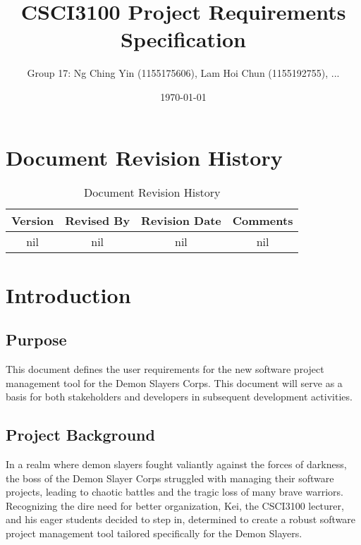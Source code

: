 \documentclass[11pt]{article}
\title{CSCI3100 Project Requirements Specification}
\author{Group 17: Ng Ching Yin (1155175606), Lam Hoi Chun (1155192755), ...}
\date{\today}
\begin{document}
\maketitle

{
    \hypersetup{linkcolor=black}
    \tableofcontents
}

\newpage

\section{Document Revision History}
\begin{table}[h]
    \centering
    \caption{Document Revision History}
    \begin{tabular}{cccc}
        \toprule
        Version & Revised By & Revision Date & Comments \\
        \midrule
        nil & nil & nil & nil \\
        \bottomrule
    \end{tabular}
    \label{tab:docs_rev_hist}
\end{table}

\section{Introduction}

\subsection{Purpose}

This document defines the user requirements for the new software project management
tool for the Demon Slayers Corps. This document will serve as a basis for both
stakeholders and developers in subsequent development activities.

\subsection{Project Background}

In a realm where demon slayers fought valiantly against the forces of darkness, the boss of
the Demon Slayer Corps struggled with managing their software projects, leading to chaotic
battles and the tragic loss of many brave warriors. Recognizing the dire need for better
organization, Kei, the CSCI3100 lecturer, and his eager students decided to step in, determined
to create a robust software project management tool tailored specifically for the Demon Slayers.
\end{document}
